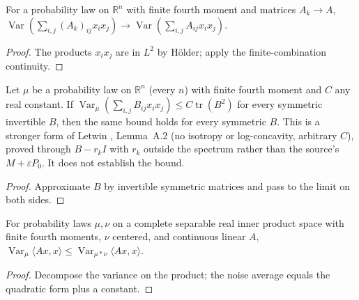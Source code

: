\begin{lemma}
  \label{lem:quadratic-matrix-variance-continuity}
  \leanok
  For a probability law on $\mathbb R^n$ with finite fourth moment and matrices $A_k\to A$,
  $\operatorname{Var}(\sum_{i,j}(A_k)_{ij}x_ix_j)\to\operatorname{Var}(\sum_{i,j}A_{ij}x_ix_j)$.
\end{lemma}
\begin{proof}
  \leanok
  The products $x_ix_j$ are in $L^2$ by H\"older; apply the finite-combination continuity.
\end{proof}

\begin{lemma}
  \label{lem:letwin-singular-extension}
  \leanok
  Let $\mu$ be a probability law on $\mathbb R^n$ (every $n$) with finite fourth moment and $C$ any real constant. If
  $\operatorname{Var}_\mu(\sum_{i,j}B_{ij}x_ix_j)\le C\operatorname{tr}(B^2)$ for every symmetric invertible $B$, then the same
  bound holds for every symmetric $B$. This is a stronger form of Letwin \cite{Letwin2026QuadraticKLS}, Lemma~A.2 (no
  isotropy or log-concavity, arbitrary $C$), proved through $B-r_kI$ with $r_k$ outside the spectrum rather than the source's
  $M+\varepsilon P_0$. It does not establish the bound.
\end{lemma}
\begin{proof}
  \leanok
  Approximate $B$ by invertible symmetric matrices and pass to the limit on both sides.
\end{proof}

\begin{lemma}
  \label{lem:centered-noise-quadratic-variance}
  \leanok
  For probability laws $\mu,\nu$ on a complete separable real inner product space with finite fourth moments, $\nu$ centered,
  and continuous linear $A$, $\operatorname{Var}_\mu\langle Ax,x\rangle\le\operatorname{Var}_{\mu*\nu}\langle Ax,x\rangle$.
\end{lemma}
\begin{proof}
  \leanok
  Decompose the variance on the product; the noise average equals the quadratic form plus a constant.
\end{proof}

